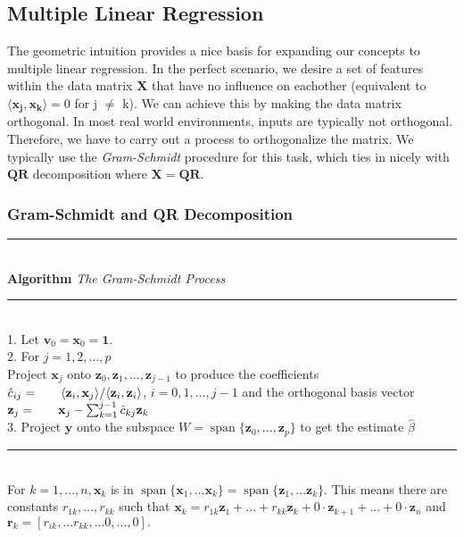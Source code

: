 \documentclass[11pt, letterpaper]{article}
\DeclareMathOperator{\spn}{span}
\renewcommand{\vec}[1]{\mathbf{#1}}
\newcommand{\inner}[2]{\langle #1, #2 \rangle}
\begin{document}
\subsection{Multiple Linear Regression}

The geometric intuition provides a nice basis for expanding our concepts to multiple linear regression. In the perfect scenario, we desire a set of features within the data matrix $\textbf{X}$ that have no influence on eachother (equivalent to $\inner{\vec{x_j}}{\vec{x_k}} = 0 $ for j $\neq$ k). We can achieve this by making the data matrix orthogonal. In most real world environments, inputs are typically not orthogonal. Therefore, we have to carry out a process to orthogonalize the matrix. We typically use the \textit{Gram-Schmidt} procedure for this task, which ties in nicely with $\textbf{QR}$ decomposition where $\mathbf{X} = \mathbf{QR}$.

\subsubsection{Gram-Schmidt and QR Decomposition}

\noindent\rule{13cm}{1.9pt} \\
 \textbf{Algorithm} \textit{The Gram-Schmidt Process}  \\
\noindent\rule{13cm}{0.8pt} \\
1. Let $\vec{v}_0 = \mathbf{x}_0 = \vec{1}$. \\
2. For $j = 1, 2,..., p$\\
\hspace*{18pt} Project $\mathbf{x}_j$ onto $\mathbf{z}_0, \mathbf{z}_1,...,\mathbf{z}_{j-1}$ to produce the coefficients $\hat{c}_{ij} = \\ 
\hspace*{18pt} \inner{\vec{z}_i}{\vec{x}_j} / \inner{\vec{z}_i}{\vec{z}_i}$,
$i = 0, 1,..., j - 1$ and the orthogonal basis vector $\vec{z}_j = \\ 
\hspace*{18pt} \vec{x}_j - \sum_{k=1}^{j-1}\hat{c}_{kj}\vec{z}_k$\\
3. Project $\vec{y}$ onto the subspace $W = \spn\{\vec{z}_0,...,\vec{z}_p\}$ to get the estimate $\hat{\beta}$ \\
\noindent\rule{13cm}{1.9pt} \\ 

For $k = 1,...,n, \vec{x}_k$ is in $\spn\{\vec{x}_1,...\vec{x}_k\} = \spn\{\vec{z}_1,...\vec{z}_k\}$. This means there are constants $r_{1k},...,r_{kk}$ such that $\vec{x}_k = r_{1k}\vec{z}_1 + ... + r_{kk}\vec{z}_k + 0 \cdot \vec{z}_{k+1} + ... + 0 \cdot \vec{z}_n$ and $\vec{r}_k = [r_{ik},...r_{kk},...0,...,0].$ \\
\end{document}
